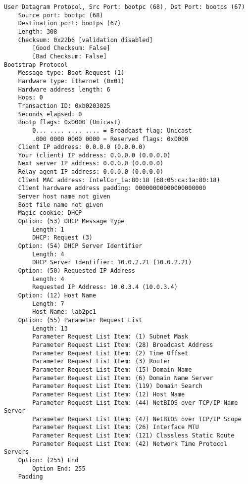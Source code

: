 \begin{lstlisting}
User Datagram Protocol, Src Port: bootpc (68), Dst Port: bootps (67)
    Source port: bootpc (68)
    Destination port: bootps (67)
    Length: 308
    Checksum: 0x22b6 [validation disabled]
        [Good Checksum: False]
        [Bad Checksum: False]
Bootstrap Protocol
    Message type: Boot Request (1)
    Hardware type: Ethernet (0x01)
    Hardware address length: 6
    Hops: 0
    Transaction ID: 0xb0203025
    Seconds elapsed: 0
    Bootp flags: 0x0000 (Unicast)
        0... .... .... .... = Broadcast flag: Unicast
        .000 0000 0000 0000 = Reserved flags: 0x0000
    Client IP address: 0.0.0.0 (0.0.0.0)
    Your (client) IP address: 0.0.0.0 (0.0.0.0)
    Next server IP address: 0.0.0.0 (0.0.0.0)
    Relay agent IP address: 0.0.0.0 (0.0.0.0)
    Client MAC address: IntelCor_1a:80:18 (68:05:ca:1a:80:18)
    Client hardware address padding: 00000000000000000000
    Server host name not given
    Boot file name not given
    Magic cookie: DHCP
    Option: (53) DHCP Message Type
        Length: 1
        DHCP: Request (3)
    Option: (54) DHCP Server Identifier
        Length: 4
        DHCP Server Identifier: 10.0.2.21 (10.0.2.21)
    Option: (50) Requested IP Address
        Length: 4
        Requested IP Address: 10.0.3.4 (10.0.3.4)
    Option: (12) Host Name
        Length: 7
        Host Name: lab2pc1
    Option: (55) Parameter Request List
        Length: 13
        Parameter Request List Item: (1) Subnet Mask
        Parameter Request List Item: (28) Broadcast Address
        Parameter Request List Item: (2) Time Offset
        Parameter Request List Item: (3) Router
        Parameter Request List Item: (15) Domain Name
        Parameter Request List Item: (6) Domain Name Server
        Parameter Request List Item: (119) Domain Search
        Parameter Request List Item: (12) Host Name
        Parameter Request List Item: (44) NetBIOS over TCP/IP Name Server
        Parameter Request List Item: (47) NetBIOS over TCP/IP Scope
        Parameter Request List Item: (26) Interface MTU
        Parameter Request List Item: (121) Classless Static Route
        Parameter Request List Item: (42) Network Time Protocol Servers
    Option: (255) End
        Option End: 255
    Padding

\end{lstlisting}
